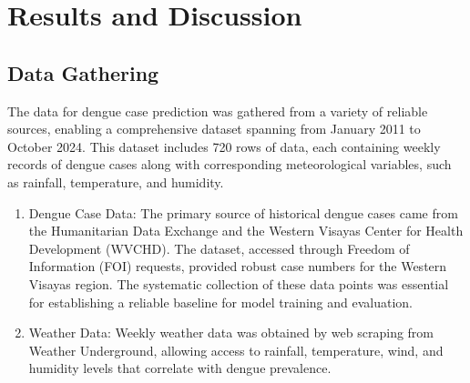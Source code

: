 \chapter{Results and Discussion}
\section{Data Gathering}
The data for dengue case prediction was gathered from a variety of reliable sources, enabling a comprehensive dataset spanning from January 2011 to October 2024. This dataset includes 720 rows of data, each containing weekly records of dengue cases along with corresponding meteorological variables, such as rainfall, temperature, and humidity.
\begin{enumerate}
	\item Dengue Case Data: The primary source of historical dengue cases came from the Humanitarian Data Exchange and the Western Visayas Center for Health Development (WVCHD). The dataset, accessed through Freedom of Information (FOI) requests, provided robust case numbers for the Western Visayas region. The systematic collection of these data points was essential for establishing a reliable baseline for model training and evaluation.
	\item Weather Data: Weekly weather data was obtained by web scraping from Weather Underground, allowing access to rainfall, temperature, wind, and humidity levels that correlate with dengue prevalence.
\end{enumerate}
\begin{table}[h!]
	\centering
	\caption{Snippet of the combined dataset}
	\label{tab:data_snippet}
\end{table}

